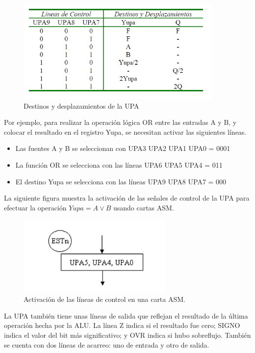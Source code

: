 \documentclass[12pt]{book}
\theoremstyle{definition}
\theoremstyle{remark}
\theoremstyle{plain}
\begin{document}
\begin{figure}
\centering
\includegraphics[width=4in]{tabla3.jpg}
\caption{Destinos y desplazamientos de la UPA}
\label{fig35}
\end{figure}

Por ejemplo, para realizar la operación lógica OR entre las entradas A y B, y colocar el resultado
en el registro Yupa, se necesitan activar las siguientes líneas.
\begin{itemize}
\item  Las fuentes A y B se seleccionan con UPA3 UPA2 UPA1 UPA0 = 0001
\item La función OR se selecciona con las líneas UPA6 UPA5 UPA4 = 011
\item El destino Yupa se selecciona con las líneas UPA9 UPA8 UPA7 = 000
\end{itemize}

La siguiente figura muestra la activación de las señales de control de la UPA para efectuar la
operación $Yupa=A \vee B$ usando cartas ASM.

\begin{figure}
\centering
\includegraphics[width=3in]{tabla4.jpg}
\caption{Activación de las líneas de control en una carta ASM.}
\label{fig36}
\end{figure}

La UPA también tiene unas líneas de salida que reflejan el resultado de la última operación hecha
por la ALU. La línea Z indica si el resultado fue cero; SIGNO indica el valor del bit más
significativo; y OVR indica si hubo sobreflujo. También se cuenta con dos líneas de acarreo: uno de
entrada y otro de salida.
\end{document}
